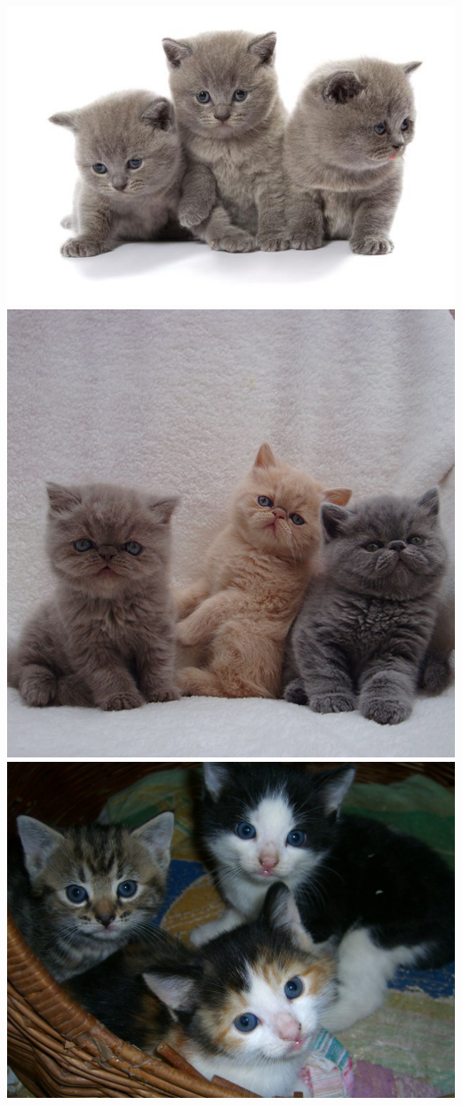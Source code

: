 \documentclass{article}
\begin{document}
\includegraphics[width=.33\textwidth]{kittens.jpg}
\includegraphics[width=.33\textwidth]{persian-kittens-07.jpg}
\includegraphics[width=.33\textwidth]{kittens2.jpg}

\lipsum
\end{document}

